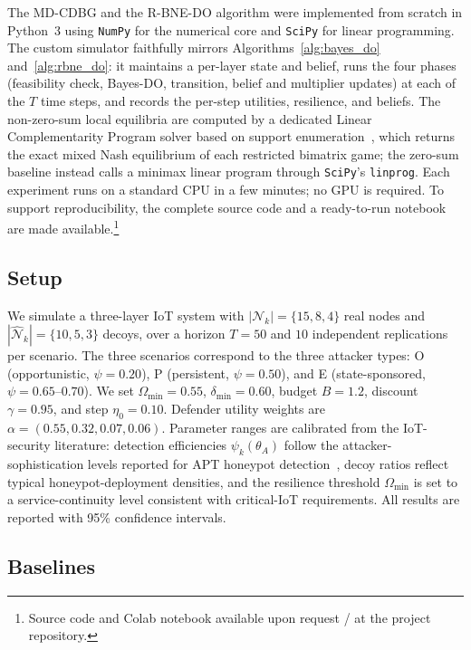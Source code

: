 \documentclass[conference]{IEEEtran}
\begin{document}
The MD-CDBG and the R-BNE-DO algorithm were implemented from scratch in
Python~3 using \texttt{NumPy} for the numerical core and \texttt{SciPy}
for linear programming. The custom simulator faithfully mirrors
Algorithms~\ref{alg:bayes_do} and~\ref{alg:rbne_do}: it maintains a per-layer
state and belief, runs the four phases (feasibility check, Bayes-DO,
transition, belief and multiplier updates) at each of the $T$ time steps, and
records the per-step utilities, resilience, and beliefs. The non-zero-sum local
equilibria are computed by a dedicated Linear Complementarity Program
solver based on support enumeration~\cite{porter2008}, which returns the exact
mixed Nash equilibrium of each restricted bimatrix game; the zero-sum baseline
instead calls a minimax linear program through \texttt{SciPy}'s
\texttt{linprog}. Each experiment runs on a standard CPU in a few minutes; no
GPU is required. To support reproducibility, the complete source code and a
ready-to-run notebook are made available.\footnote{Source code and Colab
notebook available upon request / at the project repository.}

\subsection{Setup}

We simulate a three-layer IoT system with $|\mathcal{N}_k|=\{15,8,4\}$ real
nodes and $|\hat{\mathcal{N}}_k|=\{10,5,3\}$ decoys, over a horizon $T=50$ and
$10$ independent replications per scenario. The three scenarios correspond to
the three attacker types: O (opportunistic, $\psi=0.20$), P (persistent,
$\psi=0.50$), and E (state-sponsored, $\psi=0.65$--$0.70$). We set
$\Omega_{\min}=0.55$, $\delta_{\min}=0.60$, budget $B=1.2$, discount
$\gamma=0.95$, and step $\eta_0=0.10$. Defender utility weights are
$\alpha=(0.55,0.32,0.07,0.06)$. Parameter ranges are calibrated from the
IoT-security literature: detection efficiencies $\psi_k(\theta_A)$ follow the
attacker-sophistication levels reported for APT honeypot
detection~\cite{wan2022}, decoy ratios reflect typical honeypot-deployment
densities, and the resilience threshold $\Omega_{\min}$ is set to a
service-continuity level consistent with critical-IoT requirements. All results
are reported with 95\% confidence intervals.

\subsection{Baselines}
\end{document}
